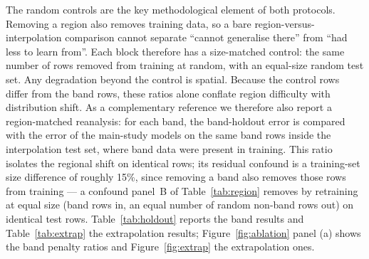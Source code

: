 \documentclass[preprint,12pt,authoryear]{elsarticle}
\begin{document}
The random controls are the key methodological element of both protocols.
Removing a region also removes training data, so a bare
region-versus-interpolation comparison cannot separate ``cannot generalise
there'' from ``had less to learn from''. Each block therefore has a
size-matched control: the same number of rows removed from training at
random, with an equal-size random test set. Any degradation beyond the
control is spatial. Because the control rows differ from the band rows,
these ratios alone conflate region difficulty with distribution shift. As a
complementary reference we therefore also report a region-matched
reanalysis: for each band, the band-holdout error is compared with the
error of the main-study models on the same band rows inside the
interpolation test set, where band data were present in training. This
ratio isolates the regional shift on identical rows; its residual confound
is a training-set size difference of roughly 15\%, since removing a band
also removes those rows from training --- a confound panel~B of
Table~\ref{tab:region} removes by retraining at equal size (band rows in,
an equal number of random non-band rows out) on identical test rows. Table~\ref{tab:holdout} reports the band results and
Table~\ref{tab:extrap} the extrapolation results;
Figure~\ref{fig:ablation} panel (a) shows the band penalty ratios and
Figure~\ref{fig:extrap} the extrapolation ones.

\begin{table}[htbp]
\centering
\caption{Contiguous interior-band holdout. Top: test MAE on the random
control, the held-out temperature band, and the held-out composition band
(mean over three seeds; uncertainty in units of the last digit). Bottom:
penalty ratios (band MAE / control MAE) for the temperature and composition
bands. The ratios compare the holdout error against a size-matched random
control (an equal number of rows removed at random and evaluated on those
random rows). This quantifies whether removing a contiguous band is costlier
than removing random rows, but does not by itself separate region difficulty
from distribution shift; a region-matched reanalysis on identical band rows
is reported in Table~\ref{tab:region}.}
\label{tab:holdout}
\small

\end{table}
\end{document}
